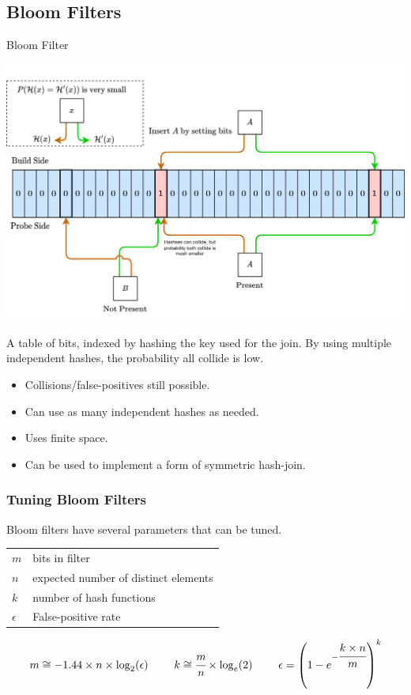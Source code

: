 \subsection{Bloom Filters}
\begin{definitionbox}{Bloom Filter}
    \begin{center}
        \includegraphics[width=\textwidth]{streams/images/bloom_filter.drawio.png}
    \end{center}
    A table of bits, indexed by hashing the key used for the join. By using multiple independent hashes, the probability all collide is low.
    \begin{itemize}
        \item Collisions/false-positives still possible.
        \item Can use as many independent hashes as needed.
        \item Uses finite space.
        \item Can be used to implement a form of symmetric hash-join.
    \end{itemize}
\end{definitionbox}
\subsubsection{Tuning Bloom Filters}
\noindent Bloom filters have several parameters that can be tuned.
\\ \begin{tabular}{l p{}}
    $m$        & bits in filter \\ 
    $n$        & expected number of distinct elements \\ 
    $k$        & number of hash functions \\ 
    $\epsilon$ & False-positive rate \\
\end{tabular}
\[\begin{matrix}
    m \cong -1.44 \times n \times \log_2(\epsilon) & \ &
    k \cong \cfrac{m}{n} \times \log_e(2) & \ &
    \epsilon  = \left( 1 - e^{-\cfrac{k \times n}{m}}\right)^k \\
\end{matrix}\]
